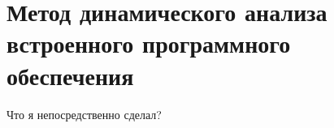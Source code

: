 \section{Метод динамического анализа встроенного программного обеспечения}
Что я непосредственно сделал?
